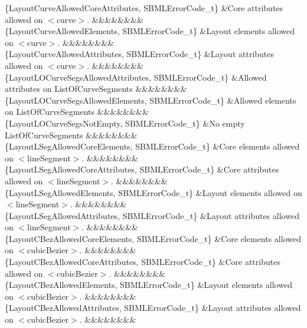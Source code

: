 \begin{DoxyParagraph}{}
\begin{longtabu}
\{Layout\+Curve\+Allowed\+Core\+Attributes, S\+B\+M\+L\+Error\+Code\+\_\+t\} &Core attributes allowed on {\ttfamily $<$curve$>$}. &&&&&&&&\\
\{Layout\+Curve\+Allowed\+Elements, S\+B\+M\+L\+Error\+Code\+\_\+t\} &Layout elements allowed on {\ttfamily $<$curve$>$}. &&&&&&&&\\
\{Layout\+Curve\+Allowed\+Attributes, S\+B\+M\+L\+Error\+Code\+\_\+t\} &Layout attributes allowed on {\ttfamily $<$curve$>$}. &&&&&&&&\\
\{Layout\+L\+O\+Curve\+Segs\+Allowed\+Attributes, S\+B\+M\+L\+Error\+Code\+\_\+t\} &Allowed attributes on List\+Of\+Curve\+Segments &&&&&&&&\\
\{Layout\+L\+O\+Curve\+Segs\+Allowed\+Elements, S\+B\+M\+L\+Error\+Code\+\_\+t\} &Allowed elements on List\+Of\+Curve\+Segments &&&&&&&&\\
\{Layout\+L\+O\+Curve\+Segs\+Not\+Empty, S\+B\+M\+L\+Error\+Code\+\_\+t\} &No empty List\+Of\+Curve\+Segments &&&&&&&&\\
\{Layout\+L\+Seg\+Allowed\+Core\+Elements, S\+B\+M\+L\+Error\+Code\+\_\+t\} &Core elements allowed on {\ttfamily $<$line\+Segment$>$}. &&&&&&&&\\
\{Layout\+L\+Seg\+Allowed\+Core\+Attributes, S\+B\+M\+L\+Error\+Code\+\_\+t\} &Core attributes allowed on {\ttfamily $<$line\+Segment$>$}. &&&&&&&&\\
\{Layout\+L\+Seg\+Allowed\+Elements, S\+B\+M\+L\+Error\+Code\+\_\+t\} &Layout elements allowed on {\ttfamily $<$line\+Segment$>$}. &&&&&&&&\\
\{Layout\+L\+Seg\+Allowed\+Attributes, S\+B\+M\+L\+Error\+Code\+\_\+t\} &Layout attributes allowed on {\ttfamily $<$line\+Segment$>$}. &&&&&&&&\\
\{Layout\+C\+Bez\+Allowed\+Core\+Elements, S\+B\+M\+L\+Error\+Code\+\_\+t\} &Core elements allowed on {\ttfamily $<$cubic\+Bezier$>$}. &&&&&&&&\\
\{Layout\+C\+Bez\+Allowed\+Core\+Attributes, S\+B\+M\+L\+Error\+Code\+\_\+t\} &Core attributes allowed on {\ttfamily $<$cubic\+Bezier$>$}. &&&&&&&&\\
\{Layout\+C\+Bez\+Allowed\+Elements, S\+B\+M\+L\+Error\+Code\+\_\+t\} &Layout elements allowed on {\ttfamily $<$cubic\+Bezier$>$}. &&&&&&&&\\
\{Layout\+C\+Bez\+Allowed\+Attributes, S\+B\+M\+L\+Error\+Code\+\_\+t\} &Layout attributes allowed on {\ttfamily $<$cubic\+Bezier$>$}. &&&&&&&&\\

\end{longtabu}
\end{DoxyParagraph}
